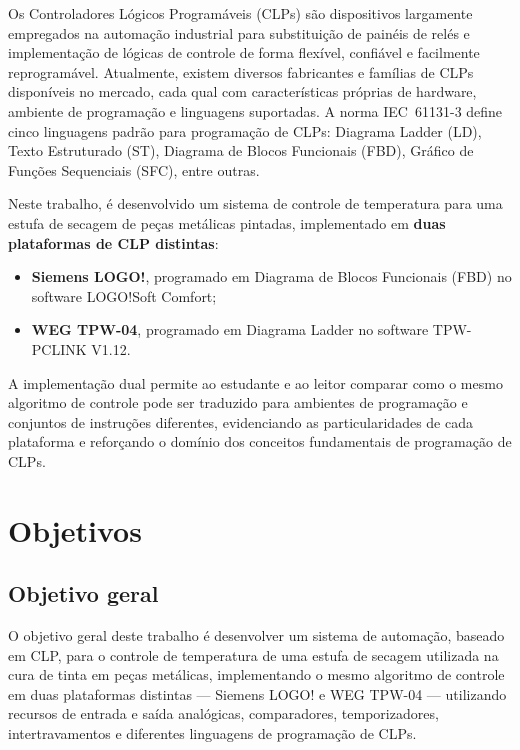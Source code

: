 \documentclass[
  12pt,
  openright,
  oneside,
  a4paper,
  chapter=TITLE,
  section=TITLE,
  brazilian
]{abntex2}
\begin{document}
Os Controladores L\'{o}gicos Program\'{a}veis (CLPs) s\~{a}o dispositivos largamente empregados na automa\c{c}\~{a}o industrial para substitui\c{c}\~{a}o de pain\'{e}is de rel\'{e}s e implementa\c{c}\~{a}o de l\'{o}gicas de controle de forma flex\'{i}vel, confi\'{a}vel e facilmente reprogram\'{a}vel. Atualmente, existem diversos fabricantes e fam\'{i}lias de CLPs dispon\'{i}veis no mercado, cada qual com caracter\'{i}sticas pr\'{o}prias de hardware, ambiente de programa\c{c}\~{a}o e linguagens suportadas. A norma IEC~61131-3 define cinco linguagens padr\~{a}o para programa\c{c}\~{a}o de CLPs: Diagrama Ladder (LD), Texto Estruturado (ST), Diagrama de Blocos Funcionais (FBD), Gr\'{a}fico de Fun\c{c}\~{o}es Sequenciais (SFC), entre outras.

Neste trabalho, \'{e} desenvolvido um sistema de controle de temperatura para uma estufa de secagem de pe\c{c}as met\'{a}licas pintadas, implementado em \textbf{duas plataformas de CLP distintas}:
\begin{itemize}
    \item \textbf{Siemens LOGO!}, programado em Diagrama de Blocos Funcionais (FBD) no software LOGO!Soft Comfort;
    \item \textbf{WEG TPW-04}, programado em Diagrama Ladder no software TPW-PCLINK V1.12.
\end{itemize}

A implementa\c{c}\~{a}o dual permite ao estudante e ao leitor comparar como o mesmo algoritmo de controle pode ser traduzido para ambientes de programa\c{c}\~{a}o e conjuntos de instru\c{c}\~{o}es diferentes, evidenciando as particularidades de cada plataforma e refor\c{c}ando o dom\'{i}nio dos conceitos fundamentais de programa\c{c}\~{a}o de CLPs.

\chapter{Objetivos}

\section{Objetivo geral}

O objetivo geral deste trabalho \'{e} desenvolver um sistema de automa\c{c}\~{a}o, baseado em CLP, para o controle de temperatura de uma estufa de secagem utilizada na cura de tinta em pe\c{c}as met\'{a}licas, implementando o mesmo algoritmo de controle em duas plataformas distintas --- Siemens LOGO! e WEG TPW-04 --- utilizando recursos de entrada e sa\'{i}da anal\'{o}gicas, comparadores, temporizadores, intertravamentos e diferentes linguagens de programa\c{c}\~{a}o de CLPs.
\end{document}
